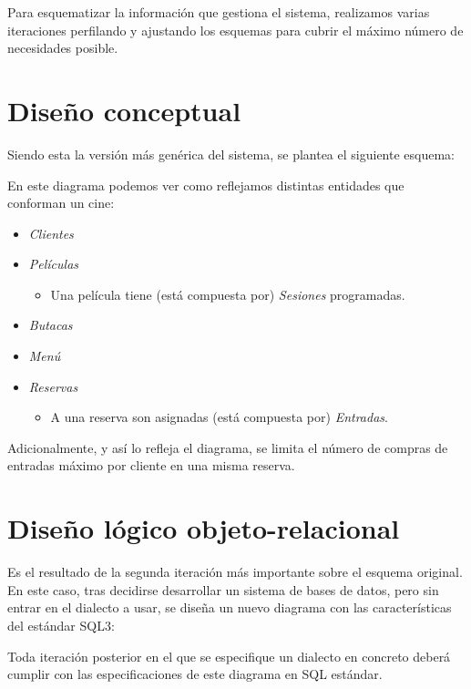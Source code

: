 Para esquematizar la información que gestiona el sistema, realizamos varias iteraciones perfilando y ajustando los esquemas para cubrir el máximo número de necesidades posible.

\section{Diseño conceptual}
Siendo esta la versión más genérica del sistema, se plantea el siguiente esquema:

En este diagrama podemos ver como reflejamos distintas entidades que conforman un cine:
\begin{itemize}
    \item \textit{Clientes}
    \item \textit{Películas}
    \begin{itemize}
        \item Una película tiene (está compuesta por) \textit{Sesiones} programadas.
    \end{itemize}
    \item \textit{Butacas}
    \item \textit{Menú}
    \item \textit{Reservas}
    \begin{itemize}
        \item A una reserva son asignadas (está compuesta por) \textit{Entradas}.
    \end{itemize}
\end{itemize}

Adicionalmente, y así lo refleja el diagrama, se limita el número de compras de entradas máximo por cliente en una misma reserva.

\newpage
\section{Diseño lógico objeto-relacional}
Es el resultado de la segunda iteración más importante sobre el esquema original. En este caso, tras decidirse desarrollar un sistema de bases de datos, pero sin entrar en el dialecto a usar, se diseña un nuevo diagrama con las características del estándar SQL3:

Toda iteración posterior en el que se especifique un dialecto en concreto deberá cumplir con las especificaciones de este diagrama en SQL estándar. \\

